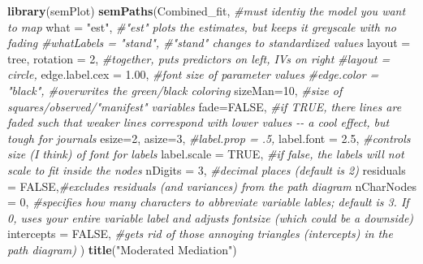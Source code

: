 \documentclass[
  11pt,
]{book}
\newenvironment{Shaded}{\begin{snugshade}}{\end{snugshade}}
\newcommand{\AttributeTok}[1]{\textcolor[rgb]{0.27,0.27,0.27}{#1}}
\newcommand{\CommentTok}[1]{\textcolor[rgb]{0.37,0.37,0.37}{\textit{#1}}}
\newcommand{\ConstantTok}[1]{\textcolor[rgb]{0.37,0.37,0.37}{#1}}
\newcommand{\DecValTok}[1]{\textcolor[rgb]{0.06,0.06,0.06}{#1}}
\newcommand{\FloatTok}[1]{\textcolor[rgb]{0.06,0.06,0.06}{#1}}
\newcommand{\FunctionTok}[1]{\textcolor[rgb]{0.27,0.27,0.27}{\textbf{#1}}}
\newcommand{\NormalTok}[1]{#1}
\newcommand{\StringTok}[1]{\textcolor[rgb]{0.5,0.5,0.5}{#1}}
\begin{document}
\begin{Shaded}
\begin{Highlighting}[]
\FunctionTok{library}\NormalTok{(semPlot)}
\FunctionTok{semPaths}\NormalTok{(Combined\_fit, }\CommentTok{\#must identiy the model you want to map}
         \AttributeTok{what =} \StringTok{"est"}\NormalTok{, }\CommentTok{\#"est" plots the estimates, but keeps it greyscale with no fading}
         \CommentTok{\#whatLabels = "stand", \#"stand" changes to standardized values}
         \AttributeTok{layout =} \StringTok{\textquotesingle{}tree\textquotesingle{}}\NormalTok{, }\AttributeTok{rotation =} \DecValTok{2}\NormalTok{, }\CommentTok{\#together, puts predictors on left, IVs on right }
         \CommentTok{\#layout = \textquotesingle{}circle\textquotesingle{},}
         \AttributeTok{edge.label.cex =} \FloatTok{1.00}\NormalTok{, }\CommentTok{\#font size of parameter values}
         \CommentTok{\#edge.color = "black", \#overwrites the green/black coloring}
         \AttributeTok{sizeMan=}\DecValTok{10}\NormalTok{, }\CommentTok{\#size of squares/observed/"manifest" variables}
         \AttributeTok{fade=}\ConstantTok{FALSE}\NormalTok{, }\CommentTok{\#if TRUE, there lines are faded such that weaker lines correspond with lower values {-}{-} a cool effect, but tough for journals}
         \AttributeTok{esize=}\DecValTok{2}\NormalTok{, }
         \AttributeTok{asize=}\DecValTok{3}\NormalTok{,}
         \CommentTok{\#label.prop = .5,}
         \AttributeTok{label.font =} \FloatTok{2.5}\NormalTok{, }\CommentTok{\#controls size (I think) of font for labels}
         \AttributeTok{label.scale =} \ConstantTok{TRUE}\NormalTok{, }\CommentTok{\#if false, the labels will not scale to fit inside the nodes}
         \AttributeTok{nDigits =} \DecValTok{3}\NormalTok{, }\CommentTok{\#decimal places (default is 2)}
         \AttributeTok{residuals =} \ConstantTok{FALSE}\NormalTok{,}\CommentTok{\#excludes residuals (and variances) from the path diagram}
         \AttributeTok{nCharNodes =} \DecValTok{0}\NormalTok{, }\CommentTok{\#specifies how many characters to abbreviate variable lables; default is 3.  If 0, uses your entire variable label and adjusts fontsize (which could be a downside)}
         \AttributeTok{intercepts =} \ConstantTok{FALSE}\NormalTok{, }\CommentTok{\#gets rid of those annoying triangles (intercepts) in the path diagram)}
\NormalTok{)}
\FunctionTok{title}\NormalTok{(}\StringTok{"Moderated Mediation"}\NormalTok{)}
\end{Highlighting}
\end{Shaded}
\end{document}
